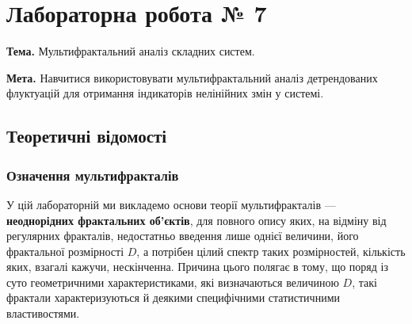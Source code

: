 \documentclass[
  letterpaper,
]{report}
\begin{document}

\hypertarget{ux43bux430ux431ux43eux440ux430ux442ux43eux440ux43dux430-ux440ux43eux431ux43eux442ux430-7}{%
\chapter{Лабораторна робота №
7}\label{ux43bux430ux431ux43eux440ux430ux442ux43eux440ux43dux430-ux440ux43eux431ux43eux442ux430-7}}

\textbf{Тема.} Мультифрактальний аналіз складних систем.

\textbf{Мета.} Навчитися використовувати мультифрактальний аналіз
детрендованих флуктуацій для отримання індикаторів нелінійних змін у
системі.

\hypertarget{ux442ux435ux43eux440ux435ux442ux438ux447ux43dux456-ux432ux456ux434ux43eux43cux43eux441ux442ux456-6}{%
\section{Теоретичні
відомості}\label{ux442ux435ux43eux440ux435ux442ux438ux447ux43dux456-ux432ux456ux434ux43eux43cux43eux441ux442ux456-6}}

\hypertarget{ux43eux437ux43dux430ux447ux435ux43dux43dux44f-ux43cux443ux43bux44cux442ux438ux444ux440ux430ux43aux442ux430ux43bux456ux432}{%
\subsection{Означення
мультифракталів}\label{ux43eux437ux43dux430ux447ux435ux43dux43dux44f-ux43cux443ux43bux44cux442ux438ux444ux440ux430ux43aux442ux430ux43bux456ux432}}

У цій лабораторній ми викладемо основи теорії мультифракталів ---
\textbf{неоднорідних фрактальних об'єктів}, для повного опису яких, на
відміну від регулярних фракталів, недостатньо введення лише однієї
величини, його фрактальної розмірності \(D\), а потрібен цілий спектр
таких розмірностей, кількість яких, взагалі кажучи, нескінченна. Причина
цього полягає в тому, що поряд із суто геометричними характеристиками,
які визначаються величиною \(D\), такі фрактали характеризуються й
деякими специфічними статистичними властивостями.
\end{document}
